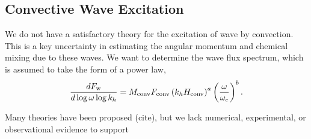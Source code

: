 {\color{purple}
\subsection{Convective Wave Excitation}
}

We do not have a satisfactory theory for the excitation of wave by convection. This is a key uncertainty in estimating the angular momentum and chemical mixing due to these waves. We want to determine the wave flux spectrum, which is assumed to take the form of a power law,
\begin{equation}
\frac{d F_{\rm w}}{d\log \omega \log k_h} = M_{\rm conv}F_{\rm conv} \left(k_h H_{\rm conv}\right)^{a} \left(\frac{\omega}{\omega_c}\right)^{b}.
\end{equation}

Many theories have been proposed (cite), but we lack numerical, experimental, or observational evidence to support  
